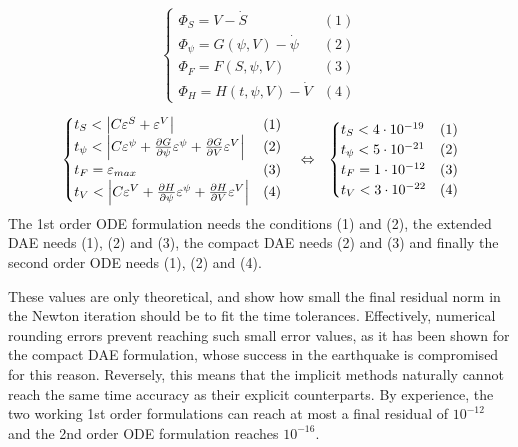 \begin{align}
	\begin{cases}
	\Phi_S = V - \dot{S}  & (1) \\ 
	\Phi_\psi = G(\psi,V) - \dot{\psi} & (2)\\ 
	\Phi_F = F(S,\psi,V) & (3)\\ 
	\Phi_H = H(t,\psi,V) - \dot{V} & (4)
	\end{cases}
\end{align}
\begin{align}
	&\begin{cases}
	t_S < \left|C\varepsilon^S + \varepsilon^V\right| & (1)\\
	t_\psi < \left|C\varepsilon^\psi + \pdv{G}{\psi}\varepsilon^\psi + \pdv{G}{V}\varepsilon^V\right| & (2)\\
	t_F = \varepsilon_{max} & (3)\\
	t_V < \left|C\varepsilon^V + \pdv{H}{\psi}\varepsilon^\psi + \pdv{H}{V}\varepsilon^V\right| & (4)
	\end{cases} &&\Leftrightarrow&
	\begin{cases}
	t_S < 4\cdot10^{-19} & (1)\\ 
	t_\psi < 5\cdot10^{-21} & (2)\\
	t_F = 1\cdot10^{-12} & (3) \\
	t_V < 3\cdot10^{-22} & (4)
	\end{cases}
\end{align}
The 1st order ODE formulation needs the conditions (1) and (2), the extended DAE needs (1), (2) and (3), the compact DAE needs (2) and (3) and finally the second order ODE needs (1), (2) and (4). 

These values are only theoretical, and show how small the final residual norm in the Newton iteration should be to fit the time tolerances. Effectively, numerical rounding errors prevent reaching such small error values, as it has been shown for the compact DAE formulation, whose success in the earthquake is compromised for this reason. Reversely, this means that the implicit methods naturally cannot reach the same time accuracy as their explicit counterparts. By experience, the two working 1st order formulations can reach at most a final residual of $10^{-12}$ and the 2nd order ODE formulation reaches $10^{-16}$.


